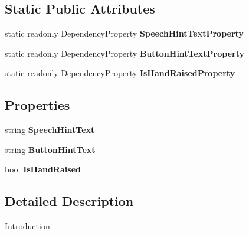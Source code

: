 \subsection*{Static Public Attributes}
\begin{DoxyCompactItemize}
\item 
static readonly Dependency\-Property {\bfseries Speech\-Hint\-Text\-Property}
\item 
static readonly Dependency\-Property {\bfseries Button\-Hint\-Text\-Property}
\item 
static readonly Dependency\-Property {\bfseries Is\-Hand\-Raised\-Property}
\end{DoxyCompactItemize}
\subsection*{Properties}
\begin{DoxyCompactItemize}
\item 
\hypertarget{class_microsoft_1_1_samples_1_1_kinect_1_1_basic_interactions_1_1_introduction_a37692ea039a54411b5f593983dae6d7d}{string {\bfseries Speech\-Hint\-Text}}\label{class_microsoft_1_1_samples_1_1_kinect_1_1_basic_interactions_1_1_introduction_a37692ea039a54411b5f593983dae6d7d}

\item 
\hypertarget{class_microsoft_1_1_samples_1_1_kinect_1_1_basic_interactions_1_1_introduction_aa45582be325de2c72c869c5672e52bdc}{string {\bfseries Button\-Hint\-Text}}\label{class_microsoft_1_1_samples_1_1_kinect_1_1_basic_interactions_1_1_introduction_aa45582be325de2c72c869c5672e52bdc}

\item 
\hypertarget{class_microsoft_1_1_samples_1_1_kinect_1_1_basic_interactions_1_1_introduction_af7d86d36035552b41535031db1472384}{bool {\bfseries Is\-Hand\-Raised}}\label{class_microsoft_1_1_samples_1_1_kinect_1_1_basic_interactions_1_1_introduction_af7d86d36035552b41535031db1472384}

\end{DoxyCompactItemize}


\subsection{Detailed Description}
\hyperlink{class_microsoft_1_1_samples_1_1_kinect_1_1_basic_interactions_1_1_introduction}{Introduction} 

